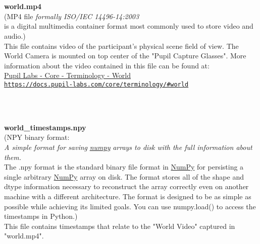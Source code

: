 \begin{description}
\begin{addmargin}[0em]{0em}
    \textbf{\\\\}
    \begin{addmargin}[1em]{0em} %
        \label{world.mp4}
        \textbf{world.mp4}\\
        (MP4 file \textit{formally ISO/IEC 14496-14:2003}\\
        is a digital multimedia container format most commonly used to store video and audio.)\\
        This file contains video of the participant's physical scene field of view.
        The World Camera is mounted on top center of the "Pupil Capture Glasses".
        More information about the video contained in this file can be found at:\\
        \href{https://docs.pupil-labs.com/core/terminology/#world}
        {{Pupil Labs - Core - Terminology - World}\\\nolinkurl{https://docs.pupil-labs.com/core/terminology/\#world}}\\
    \end{addmargin} %

    \textbf{\\\\}
    \begin{addmargin}[1em]{0em} %
        \label{world_timestamps.npy}
        \textbf{world\_timestamps.npy}\\
        (NPY binary format:\\
        \textit{A simple format for saving}
        \href{https://numpy.org/doc/stable/reference/generated/numpy.lib.format.html#module-numpy.lib.format}{\textit{numpy}}
        \textit{arrays to disk with the full information about them.}\\
        The .npy format is the standard binary file format in 
        \href{https://numpy.org/doc/stable/reference/generated/numpy.lib.format.html#module-numpy.lib.format}{NumPy}
        for persisting a single arbitrary
        \href{https://numpy.org/doc/stable/reference/generated/numpy.lib.format.html#module-numpy.lib.format}{NumPy}
        array on disk. The format stores all of the shape and dtype information necessary to
        reconstruct the array correctly even on another machine with a different architecture.
        The format is designed to be as simple as possible while achieving its limited goals.
        You can use numpy.load() to access the timestamps in Python.)\\
        This file contains timestamps that relate to the "World Video" captured in "world.mp4". 
    \end{addmargin} %
                        

\end{addmargin}
\end{description}
